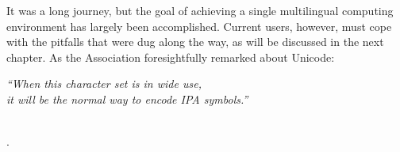 
It was a long journey, but the goal of achieving a single multilingual computing
environment has largely been accomplished. Current users, however, must cope
with the pitfalls that were dug along the way, as will be discussed in the next
chapter. As the Association foresightfully remarked about Unicode:

\begin{center} 

\textit{``When this character set is in wide use, \\
it will be the normal way to encode IPA symbols.''}

\ \\

\citep[164]{IPA1999}.

\end{center}



